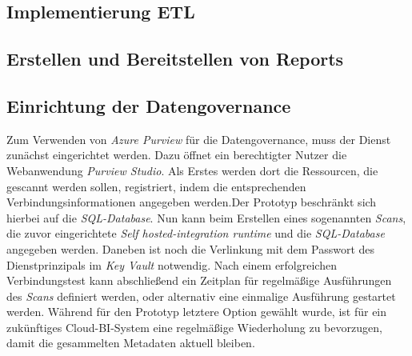 \subsection{Implementierung ETL}

\subsection{Erstellen und Bereitstellen von Reports}

\subsection{Einrichtung der Datengovernance}
Zum Verwenden von \textit{Azure Purview} für die Datengovernance, muss der Dienst zunächst eingerichtet werden. Dazu öffnet ein berechtigter Nutzer die Webanwendung \textit{Purview Studio}. Als Erstes werden dort die Ressourcen, die gescannt werden sollen, registriert, indem die entsprechenden Verbindungsinformationen angegeben werden.Der Prototyp beschränkt sich hierbei auf die \textit{SQL-Database}. Nun kann beim Erstellen eines sogenannten \textit{Scans}, die zuvor eingerichtete \textit{Self hosted-integration runtime} und die \textit{SQL-Database} angegeben werden. Daneben ist noch die Verlinkung mit dem Passwort des Dienstprinzipals im \textit{Key Vault} notwendig. Nach einem erfolgreichen Verbindungstest kann abschließend ein Zeitplan für regelmäßige Ausführungen des \textit{Scans} definiert werden, oder alternativ eine einmalige Ausführung gestartet werden. Während für den Prototyp letztere Option gewählt wurde, ist für ein zukünftiges Cloud-BI-System eine regelmäßige Wiederholung zu bevorzugen, damit die gesammelten Metadaten aktuell bleiben. 

